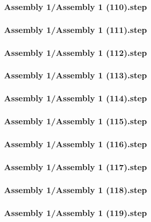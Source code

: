 \documentclass[a4paper,12pt]{article}
\begin{document}
\begin{lstlising}[language=C++]
\subsubsection{Assembly 1/Assembly 1 (110).step}

\subsubsection{Assembly 1/Assembly 1 (111).step}

\subsubsection{Assembly 1/Assembly 1 (112).step}

\subsubsection{Assembly 1/Assembly 1 (113).step}

\subsubsection{Assembly 1/Assembly 1 (114).step}

\subsubsection{Assembly 1/Assembly 1 (115).step}

\subsubsection{Assembly 1/Assembly 1 (116).step}

\subsubsection{Assembly 1/Assembly 1 (117).step}

\subsubsection{Assembly 1/Assembly 1 (118).step}

\subsubsection{Assembly 1/Assembly 1 (119).step}


\end{lstlising}
\end{document}
